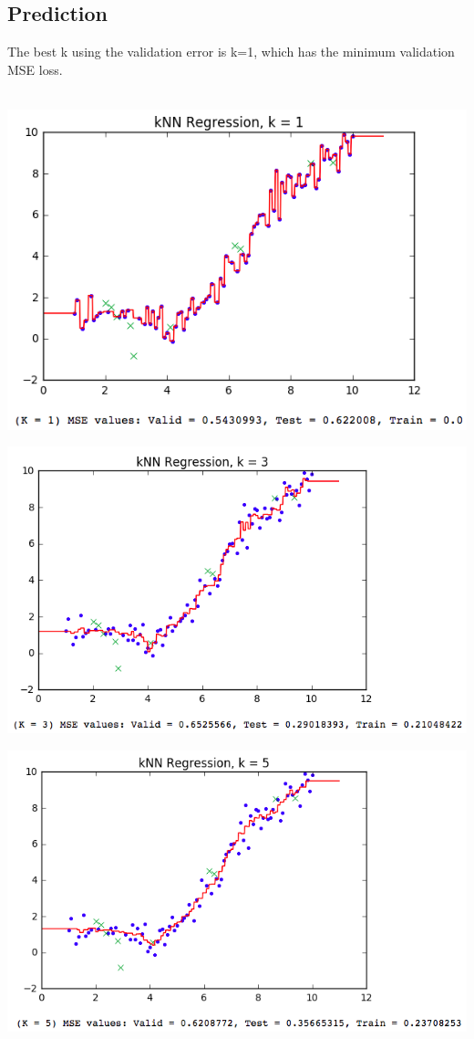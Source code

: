 \documentclass{article}
\begin{document}
\subsection{Prediction}



The best k using the validation error is k=1, which has the minimum validation MSE loss.\\
\\

\begin{center}
\centering
\includegraphics[scale=0.6]{1.png}

\includegraphics[scale=0.6]{2.png}

\includegraphics[scale=0.6]{3.png}


\end{center}
\end{document}
